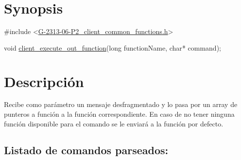 \hypertarget{client_execute_out_function_synopsis_6}{}\section{Synopsis}\label{client_execute_out_function_synopsis_6}

\begin{DoxyCode}
\textcolor{preprocessor}{#include <\hyperlink{G-2313-06-P2__client__common__functions_8h}{G-2313-06-P2\_client\_common\_functions.h}>}

\textcolor{keywordtype}{void} \hyperlink{G-2313-06-P2__client_8h_a26512d35b24fec46c8fa4c803dc00867}{client\_execute\_out\_function}(\textcolor{keywordtype}{long} functionName, \textcolor{keywordtype}{char}* command);
\end{DoxyCode}
 \hypertarget{client_execute_out_function_descripcion_6}{}\section{Descripción}\label{client_execute_out_function_descripcion_6}
Recibe como parámetro un mensaje desfragmentado y lo pasa por un array de punteros a función a la función correspondiente. En caso de no tener ninguna función disponible para el comando se le enviará a la función por defecto. ~\newline
\subsection*{Listado de comandos parseados\+:}


